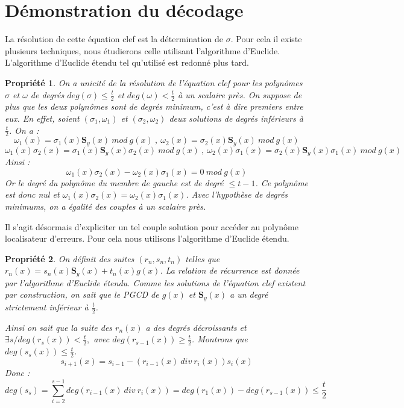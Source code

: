\documentclass{article}
\newtheorem{prop}{Propriété}
\begin{document}
	\section{Démonstration du décodage}
		\label{eqclef}
		La résolution de cette équation clef est la détermination de $\sigma$.
		Pour cela il existe plusieurs techniques, nous étudierons celle utilisant l'algorithme d'Euclide.
		L'algorithme d'Euclide étendu tel qu'utilisé est redonné plus tard.

		\begin{prop} \label{unicite} \cite{goppa}
			On a unicité de la résolution de l'équation clef pour les polynômes $\sigma$ et $\omega$ de degrés  $deg(\sigma) \leq \frac{t}{2}$ et $ deg(\omega) < \frac{t}{2} $ à un scalaire près.
			On suppose de plus que les deux polynômes sont de degrés minimum, c'est à dire premiers entre eux.
			En effet, soient $(\sigma_{1},\omega_{1})$ et $(\sigma_{2},\omega_{2})$ deux solutions de degrés inférieurs à $\frac{t}{2}$.
			On a :
			$$ \omega_{1}(x) = \sigma_{1}(x)\mathbf{S}_{y}(x) \ mod \ g(x) \ , \ \omega_{2}(x) = \sigma_{2}(x)\mathbf{S}_{y}(x) \ mod \ g(x) $$
			$$ \omega_{1}(x)\sigma_{2}(x) = \sigma_{1}(x)\mathbf{S}_{y}(x)\sigma_{2}(x) \ mod \ g(x) \ , \ \omega_{2}(x)\sigma_{1}(x) = \sigma_{2}(x)\mathbf{S}_{y}(x)\sigma_{1}(x) \ mod \ g(x) $$
			Ainsi :
			$$ \omega_{1}(x)\sigma_{2}(x) - \omega_{2}(x)\sigma_{1}(x) = 0 \ mod \ g(x) $$
			Or le degré du polynôme du membre de gauche est de degré $\leq t-1$.
			Ce polynôme est donc nul et $ \omega_{1}(x)\sigma_{2}(x) = \omega_{2}(x)\sigma_{1}(x) $.
			Avec l'hypothèse de degrés minimums, on a égalité des couples à un scalaire près.
		\end{prop}

		Il s'agit désormais d'expliciter un tel couple solution pour accéder au polynôme localisateur d'erreurs.
		Pour cela nous utilisons l'algorithme d'Euclide étendu.

		\begin{prop} \label{existence}
			On définit des suites $(r_{n},s_{n},t_{n})$ telles que $ r_{n}(x) = s_{n}(x)\mathbf{S}_{y}(x) + t_{n}(x)g(x) $.
			La relation de récurrence est donnée par l'algorithme d'Euclide étendu.
			Comme les solutions de l'équation clef existent par construction, on sait que le PGCD de $g(x)$ et $\mathbf{S}_{y}(x)$ a un degré strictement inférieur à $\frac{t}{2}$.

			Ainsi on sait que la suite des $r_{n}(x)$ a des degrés décroissants et $\exists s / deg(r_{s}(x)) < \frac{t}{2},$ avec $deg(r_{s-1}(x)) \geq \frac{t}{2}$.
			Montrons que $deg(s_{s}(x)) \leq \frac{t}{2}$.
			$$ s_{i+1}(x) = s_{i-1} - (r_{i-1}(x) \ div  \ r_{i}(x))s_{i}(x) $$
			Donc :
			$$ deg(s_{s}) = \sum_{i=2}^{s-1} deg(r_{i-1}(x) \ div  \ r_{i}(x)) = deg(r_{1}(x)) - deg(r_{s-1}(x)) \leq \frac{t}{2}$$
		\end{prop}
\end{document}
